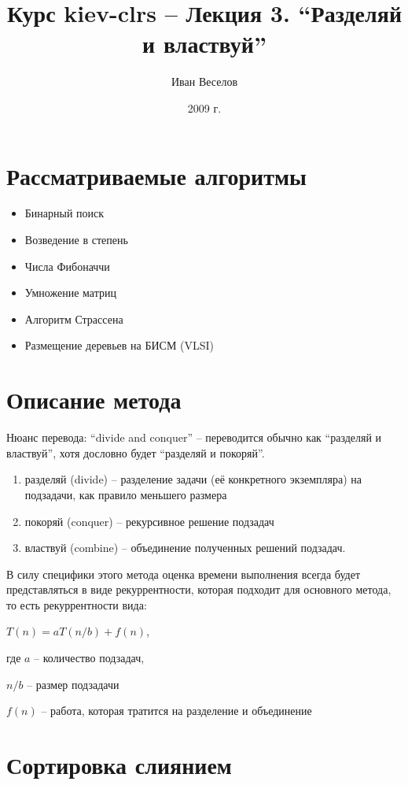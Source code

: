 \documentclass[a4paper,11pt]{article}
\author{Иван Веселов}
\title{Курс kiev-clrs -- Лекция 3. ``Разделяй и властвуй''}
\date{2009 г.}
\begin{document}
\maketitle
\tableofcontents
\newpage

\setlength{\parskip}{1ex plus 0.5ex minus 0.2ex}

\section{Рассматриваемые алгоритмы}
\begin{itemize}
\item Бинарный поиск
\item Возведение в степень
\item Числа Фибоначчи
\item Умножение матриц
\item Алгоритм Страссена
\item Размещение деревьев на БИСМ (VLSI)
\end{itemize}

\section{Описание метода}

Нюанс перевода: ``divide and conquer'' -- переводится обычно как ``разделяй и
властвуй'', хотя дословно будет ``разделяй и покоряй''.

\begin{enumerate}
\item разделяй (divide) -- разделение задачи (её конкретного экземпляра) на
  подзадачи, как правило меньшего размера
\item покоряй (conquer) -- рекурсивное решение подзадач
\item властвуй (combine) -- объединение полученных решений подзадач.
\end{enumerate}

В силу специфики этого метода оценка времени выполнения всегда будет
представляться в виде рекуррентности, которая подходит для основного метода, то
есть рекуррентности вида:

$T(n) = aT(n/b) + f(n)$,

где $a$ -- количество подзадач,

$n/b$ -- размер подзадачи

$f(n)$ -- работа, которая тратится на разделение и объединение

\section{Сортировка слиянием}
\end{document}
